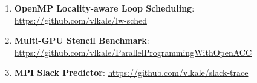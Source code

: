 
\begin{enumerate}
\item \textbf{OpenMP Locality-aware Loop Scheduling}: \url{https://github.com/vlkale/lw-sched}
\item \textbf{Multi-GPU Stencil Benchmark}: 
\url{https://github.com/vlkale/ParallelProgrammingWithOpenACC}
\item \textbf{MPI Slack Predictor}: \url{https://github.com/vlkale/slack-trace}
\end{enumerate}
